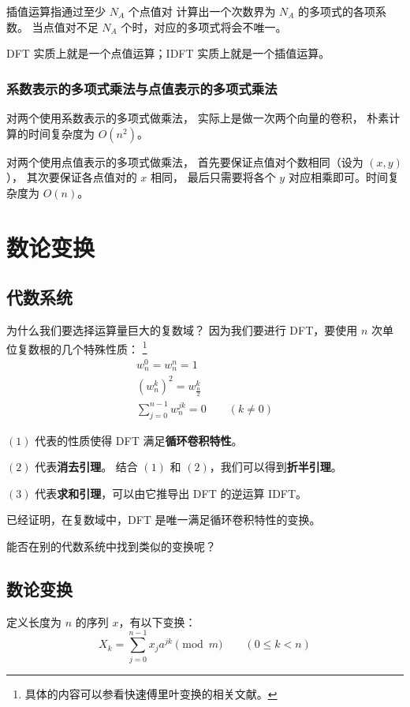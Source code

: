 \documentclass[12pt, UTF8]{article}
\begin{document}
    插值运算指通过至少 $N_A$ 个点值对
    计算出一个次数界为 $N_A$ 的多项式的各项系数。
    当点值对不足 $N_A$ 个时，对应的多项式将会不唯一。

    \bigskip
    DFT 实质上就是一个点值运算；IDFT 实质上就是一个插值运算。

    \subsubsection{系数表示的多项式乘法与点值表示的多项式乘法}
    对两个使用系数表示的多项式做乘法，
    实际上是做一次两个向量的卷积，
    朴素计算的时间复杂度为 $O(n^2)$。

    对两个使用点值表示的多项式做乘法，
    首先要保证点值对个数相同（设为 $(x, y)$），
    其次要保证各点值对的 $x$ 相同，
    最后只需要将各个 $y$ 对应相乘即可。时间复杂度为 $O(n)$。

    \section{数论变换}
    \subsection{代数系统}
    为什么我们要选择运算量巨大的复数域？
    因为我们要进行 DFT，要使用 $n$ 次单位复数根的几个特殊性质：
    \footnote{具体的内容可以参看快速傅里叶变换的相关文献。}
    \begin{gather}
        w_n^0 = w_n^n = 1
        \\
        (w_n^k)^2 = w_{\frac {n} {2}}^k
        \\
        \sum_{j = 0}^{n - 1} w_n^{jk} = 0 \qquad (k \ne 0)
    \end{gather}

    $(1)$ 代表的性质使得 DFT 满足\textbf{循环卷积特性}。

    $(2)$ 代表\textbf{消去引理}。
    结合 $(1)$ 和 $(2)$，我们可以得到\textbf{折半引理}。

    $(3)$ 代表\textbf{求和引理}，可以由它推导出 DFT 的逆运算 IDFT。

    \bigskip
    已经证明，在复数域中，DFT 是唯一满足循环卷积特性的变换。

    \bigskip
    能否在别的代数系统中找到类似的变换呢？

    \subsection{数论变换}
    定义长度为 $n$ 的序列 $x$，有以下变换：
    \begin{equation*}
        X_k = \sum_{j = 0}^{n - 1} x_j a^{jk} \pmod {m}
        \qquad (0 \le k < n)
    \end{equation*}
\end{document}
